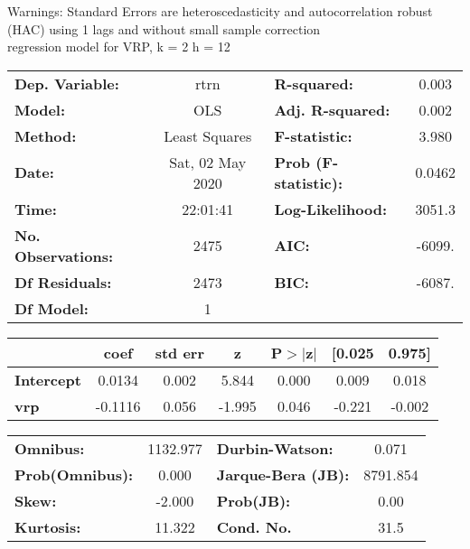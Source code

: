 Warnings: \newline
 [1] Standard Errors are heteroscedasticity and autocorrelation robust (HAC) using 1 lags and without small sample correction\\ 

regression model for VRP, k = 2 h = 12\begin{center}
\begin{tabular}{lclc}
\toprule
\textbf{Dep. Variable:}    &       rtrn       & \textbf{  R-squared:         } &     0.003   \\
\textbf{Model:}            &       OLS        & \textbf{  Adj. R-squared:    } &     0.002   \\
\textbf{Method:}           &  Least Squares   & \textbf{  F-statistic:       } &     3.980   \\
\textbf{Date:}             & Sat, 02 May 2020 & \textbf{  Prob (F-statistic):} &   0.0462    \\
\textbf{Time:}             &     22:01:41     & \textbf{  Log-Likelihood:    } &    3051.3   \\
\textbf{No. Observations:} &        2475      & \textbf{  AIC:               } &    -6099.   \\
\textbf{Df Residuals:}     &        2473      & \textbf{  BIC:               } &    -6087.   \\
\textbf{Df Model:}         &           1      & \textbf{                     } &             \\
\bottomrule
\end{tabular}
\begin{tabular}{lcccccc}
                   & \textbf{coef} & \textbf{std err} & \textbf{z} & \textbf{P$> |$z$|$} & \textbf{[0.025} & \textbf{0.975]}  \\
\midrule
\textbf{Intercept} &       0.0134  &        0.002     &     5.844  &         0.000        &        0.009    &        0.018     \\
\textbf{vrp}       &      -0.1116  &        0.056     &    -1.995  &         0.046        &       -0.221    &       -0.002     \\
\bottomrule
\end{tabular}
\begin{tabular}{lclc}
\textbf{Omnibus:}       & 1132.977 & \textbf{  Durbin-Watson:     } &    0.071  \\
\textbf{Prob(Omnibus):} &   0.000  & \textbf{  Jarque-Bera (JB):  } & 8791.854  \\
\textbf{Skew:}          &  -2.000  & \textbf{  Prob(JB):          } &     0.00  \\
\textbf{Kurtosis:}      &  11.322  & \textbf{  Cond. No.          } &     31.5  \\
\bottomrule
\end{tabular}
\end{center}

